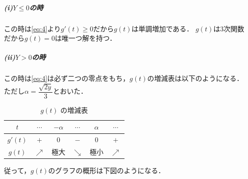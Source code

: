 \documentclass[../../main.tex]{subfiles}
\begin{document}
\subparagraph{(i)$Y\le0$の時}

この時は\cref{eq:4}より$g'(t)\ge0$だから$g(t)$は単調増加である．
$g(t)$は$3$次関数だから$g(t)=0$は唯一つ解を持つ．

\subparagraph{(ii)$Y>0$の時}

この時は\cref{eq:4}は必ず二つの零点をもち，$g(t)$の増減表は以下のようになる．
ただし$\alpha=\dfrac{\sqrt{2y}}{3}$とおいた．

\begin{table}[htb]
  \centering
  \caption{$g(t)$ の増減表}
  \label{tab:g_increase_decrease}
  \renewcommand{\arraystretch}{1.3}
  \begin{tabular}{c|ccccc}
    $t$ & $\cdots$ & $-\alpha$ & $\cdots$ & $\alpha$ & $\cdots$ \\
    \hline
    $g'(t)$ & $+$ & $0$ & $-$ & $0$ & $+$ \\
    \hline
    $g(t)$ & $\nearrow$ & 極大 & $\searrow$ & 極小 & $\nearrow$
  \end{tabular}
\end{table}

従って，$g(t)$のグラフの概形は下図のようになる．
\end{document}
